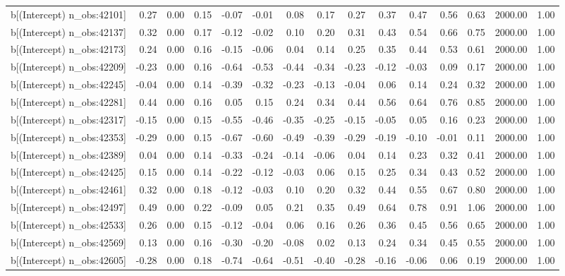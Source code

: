 \begin{table}[ht]
\begin{tabular}{rrrrrrrrrrrrrrr}
  b[(Intercept) n\_obs:42101] & 0.27 & 0.00 & 0.15 & -0.07 & -0.01 & 0.08 & 0.17 & 0.27 & 0.37 & 0.47 & 0.56 & 0.63 & 2000.00 & 1.00 \\ 
  b[(Intercept) n\_obs:42137] & 0.32 & 0.00 & 0.17 & -0.12 & -0.02 & 0.10 & 0.20 & 0.31 & 0.43 & 0.54 & 0.66 & 0.75 & 2000.00 & 1.00 \\ 
  b[(Intercept) n\_obs:42173] & 0.24 & 0.00 & 0.16 & -0.15 & -0.06 & 0.04 & 0.14 & 0.25 & 0.35 & 0.44 & 0.53 & 0.61 & 2000.00 & 1.00 \\ 
  b[(Intercept) n\_obs:42209] & -0.23 & 0.00 & 0.16 & -0.64 & -0.53 & -0.44 & -0.34 & -0.23 & -0.12 & -0.03 & 0.09 & 0.17 & 2000.00 & 1.00 \\ 
  b[(Intercept) n\_obs:42245] & -0.04 & 0.00 & 0.14 & -0.39 & -0.32 & -0.23 & -0.13 & -0.04 & 0.06 & 0.14 & 0.24 & 0.32 & 2000.00 & 1.00 \\ 
  b[(Intercept) n\_obs:42281] & 0.44 & 0.00 & 0.16 & 0.05 & 0.15 & 0.24 & 0.34 & 0.44 & 0.56 & 0.64 & 0.76 & 0.85 & 2000.00 & 1.00 \\ 
  b[(Intercept) n\_obs:42317] & -0.15 & 0.00 & 0.15 & -0.55 & -0.46 & -0.35 & -0.25 & -0.15 & -0.05 & 0.05 & 0.16 & 0.23 & 2000.00 & 1.00 \\ 
  b[(Intercept) n\_obs:42353] & -0.29 & 0.00 & 0.15 & -0.67 & -0.60 & -0.49 & -0.39 & -0.29 & -0.19 & -0.10 & -0.01 & 0.11 & 2000.00 & 1.00 \\ 
  b[(Intercept) n\_obs:42389] & 0.04 & 0.00 & 0.14 & -0.33 & -0.24 & -0.14 & -0.06 & 0.04 & 0.14 & 0.23 & 0.32 & 0.41 & 2000.00 & 1.00 \\ 
  b[(Intercept) n\_obs:42425] & 0.15 & 0.00 & 0.14 & -0.22 & -0.12 & -0.03 & 0.06 & 0.15 & 0.25 & 0.34 & 0.43 & 0.52 & 2000.00 & 1.00 \\ 
  b[(Intercept) n\_obs:42461] & 0.32 & 0.00 & 0.18 & -0.12 & -0.03 & 0.10 & 0.20 & 0.32 & 0.44 & 0.55 & 0.67 & 0.80 & 2000.00 & 1.00 \\ 
  b[(Intercept) n\_obs:42497] & 0.49 & 0.00 & 0.22 & -0.09 & 0.05 & 0.21 & 0.35 & 0.49 & 0.64 & 0.78 & 0.91 & 1.06 & 2000.00 & 1.00 \\ 
  b[(Intercept) n\_obs:42533] & 0.26 & 0.00 & 0.15 & -0.12 & -0.04 & 0.06 & 0.16 & 0.26 & 0.36 & 0.45 & 0.56 & 0.65 & 2000.00 & 1.00 \\ 
  b[(Intercept) n\_obs:42569] & 0.13 & 0.00 & 0.16 & -0.30 & -0.20 & -0.08 & 0.02 & 0.13 & 0.24 & 0.34 & 0.45 & 0.55 & 2000.00 & 1.00 \\ 
  b[(Intercept) n\_obs:42605] & -0.28 & 0.00 & 0.18 & -0.74 & -0.64 & -0.51 & -0.40 & -0.28 & -0.16 & -0.06 & 0.06 & 0.19 & 2000.00 & 1.00 \\ 

\end{tabular}
\end{table}
